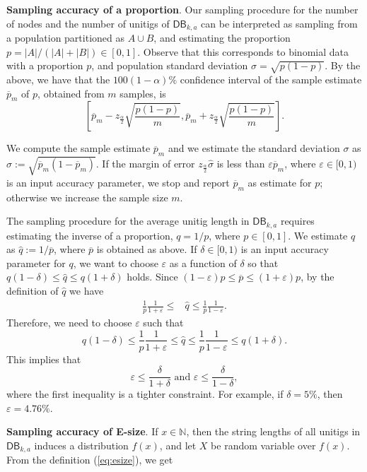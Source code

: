 \documentclass[a4paper,11pt]{article}
\newcommand{\DB}{\mathsf{DB}_{k,a}}
\renewcommand{\leq}{\leqslant}
\begin{document}
\medskip
\noindent\textbf{Sampling accuracy of a proportion}. Our sampling procedure for the number of nodes and the number of unitigs of $\DB$ can be interpreted as sampling from a population partitioned as $A \cup B$, and estimating the proportion $p = |A| / (|A| + |B|) \in [0,1]$. Observe that this corresponds to binomial data with a proportion $p$, and population standard deviation $\sigma = \sqrt{p(1-p)}$. By the above, we have that the $100(1-\alpha)\%$ confidence interval of the sample estimate $\overline{p}_m$ of $p$, obtained from $m$ samples, is
\[\left[\overline{p}_m - z_{\frac{\alpha}{2}}\sqrt{\frac{p(1-p)}{m}} , \overline{p}_m + z_{\frac{\alpha}{2}}\sqrt{\frac{p(1-p)}{m}}\right]. \]

We compute the sample estimate $\overline{p}_m$ and we estimate the standard deviation $\sigma$ as $\hat{\sigma} := \sqrt{\overline{p}_m(1-\overline{p}_m)}$. If the margin of error $z_{\frac{\alpha}{2}}\hat{\sigma}$ is less than $\varepsilon \overline{p}_m$, where $\varepsilon \in [0,1)$ is an input accuracy parameter, we stop and report $\overline{p}_m$ as estimate for $p$; otherwise we increase the sample size $m$. 

The sampling procedure for the average unitig length in $\DB$ requires estimating the inverse of a proportion, $q = 1/p$, where $p \in [0,1]$. We estimate $q$ as $\hat{q} := 1/\overline{p}$, where $\overline{p}$ is obtained as above. If $\delta \in [0,1)$ is an input accuracy parameter for $q$, we want to choose $\varepsilon$ as a function of $\delta$ so that $q (1 - \delta) \leq \hat{q} \leq q (1 + \delta)$ holds. Since $(1 - \varepsilon)p \leq \overline{p} \leq (1 + \varepsilon)p$, by the definition of $\hat{q}$ we have
\begin{align*}
\frac{1}{p} \frac{1}{1 + \varepsilon} \leq & \hat{q} \leq \frac{1}{p} \frac{1}{1 - \varepsilon}.
\end{align*}
Therefore, we need to choose $\varepsilon$ such that
\[q (1 - \delta) \leq \frac{1}{p} \frac{1}{1 + \varepsilon} \leq \hat{q} \leq \frac{1}{p} \frac{1}{1 - \varepsilon} \leq q (1+\delta).\]
This implies that
\[\varepsilon \leq \frac{\delta}{1 + \delta} \text{  and  } \varepsilon \leq \frac{\delta}{1-\delta},\]
where the first inequality is a tighter constraint. For example, if $\delta = 5\%$, then $\varepsilon = 4.76\%$.

\medskip
\noindent\textbf{Sampling accuracy of E-size}. If $x \in \mathbb{N}$, then the string lengths of all unitigs in $\DB$ induces a distribution $f(x)$, and let $X$ be random variable over $f(x)$. From the definition (\ref{eq:esize}), we get
\end{document}
